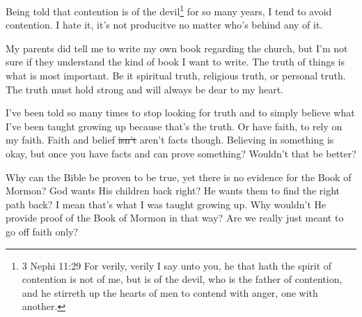 Being told that contention is of the devil\footnote{
3 Nephi 11:29 For verily, verily I say unto you, he that hath the spirit of 
contention is not of me, but is of the devil, who is the father of contention, 
and he stirreth up the hearts of men to contend with anger, one with another.
} for so many years, I tend to avoid contention. I hate it, it's not producitve no 
matter who's behind any of it.

My parents did tell me to write my own book regarding the church, but I'm not sure if
they understand the kind of book I want to write. The truth of things is what is most
important. Be it spiritual truth, religious truth, or personal truth. The truth must
hold strong and will always be dear to my heart.

I've been told so many times to stop looking for truth and to simply believe what
I've been taught growing up because that's the truth. Or have faith, to rely on my
faith. Faith and belief \st{isn't} aren't facts though. Believing in something is 
okay, but once you have facts and can prove something? Wouldn't that be better?

Why can the Bible be proven to be true, yet there is no evidence for the Book of
Mormon? God wants His children back right? He wants them to find the right path back?
I mean that's what I was taught growing up. Why wouldn't He provide proof of the Book
of Mormon in that way? Are we really just meant to go off faith only?
